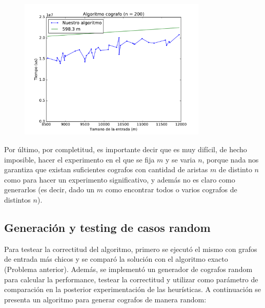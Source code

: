 \begin{figure}[H]
 \centering
	\includegraphics[width=0.8\textwidth]{graficos/problema_3/tiempos1.pdf}
	\caption{}
	\label{fig:problema3-tiempos1}
\end{figure}

Por último, por completitud, es importante decir que es muy difícil, de hecho imposible, hacer el experimento en el que se fija $m$ y se varia $n$, porque nada nos garantiza  que existan suficientes cografos con cantidad de aristas $m$ de distinto $n$ como para hacer un experimento significativo, y además no es claro como generarlos (es decir, dado un $m$ como encontrar todos o varios cografos de distintos $n$).


\subsection{Generación y testing de casos random}

Para testear la correctitud del algoritmo, primero se ejecutó el mismo con grafos de entrada más chicos y se comparó la solución con el algoritmo exacto (Problema anterior). Además, se implementó un generador de cografos random para calcular la performance, testear la correctitud y utilizar como parámetro de comparación en la posterior experimentación de las heurísticas.
A continuación se presenta un algoritmo para generar cografos de manera random:

